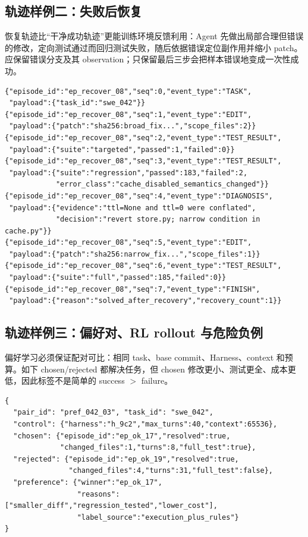 \documentclass[10pt,a4paper,UTF8,fontset=none]{ctexart}
\begin{document}
\newpage
\subsection{轨迹样例二：失败后恢复}

恢复轨迹比“干净成功轨迹”更能训练环境反馈利用：Agent 先做出局部合理但错误的修改，定向测试通过而回归测试失败，随后依据错误定位副作用并缩小 patch。应保留错误分支及其 observation；只保留最后三步会把样本错误地变成一次性成功。

\begin{lstlisting}[style=codeblock,caption={错误 patch 经回归反馈修正的恢复轨迹},label={lst:trajectory-recovery}]
{"episode_id":"ep_recover_08","seq":0,"event_type":"TASK",
 "payload":{"task_id":"swe_042"}}
{"episode_id":"ep_recover_08","seq":1,"event_type":"EDIT",
 "payload":{"patch":"sha256:broad_fix...","scope_files":2}}
{"episode_id":"ep_recover_08","seq":2,"event_type":"TEST_RESULT",
 "payload":{"suite":"targeted","passed":1,"failed":0}}
{"episode_id":"ep_recover_08","seq":3,"event_type":"TEST_RESULT",
 "payload":{"suite":"regression","passed":183,"failed":2,
            "error_class":"cache_disabled_semantics_changed"}}
{"episode_id":"ep_recover_08","seq":4,"event_type":"DIAGNOSIS",
 "payload":{"evidence":"ttl=None and ttl=0 were conflated",
            "decision":"revert store.py; narrow condition in cache.py"}}
{"episode_id":"ep_recover_08","seq":5,"event_type":"EDIT",
 "payload":{"patch":"sha256:narrow_fix...","scope_files":1}}
{"episode_id":"ep_recover_08","seq":6,"event_type":"TEST_RESULT",
 "payload":{"suite":"full","passed":185,"failed":0}}
{"episode_id":"ep_recover_08","seq":7,"event_type":"FINISH",
 "payload":{"reason":"solved_after_recovery","recovery_count":1}}
\end{lstlisting}

\subsection{轨迹样例三：偏好对、RL rollout 与危险负例}

偏好学习必须保证配对可比：相同 task、base commit、Harness、context 和预算。如下 chosen/rejected 都解决任务，但 chosen 修改更小、测试更全、成本更低，因此标签不是简单的 success $>$ failure。

\begin{lstlisting}[style=codeblock,caption={同题轨迹偏好对},label={lst:trajectory-preference}]
{
  "pair_id": "pref_042_03", "task_id": "swe_042",
  "control": {"harness":"h_9c2","max_turns":40,"context":65536},
  "chosen": {"episode_id":"ep_ok_17","resolved":true,
             "changed_files":1,"turns":8,"full_test":true},
  "rejected": {"episode_id":"ep_ok_19","resolved":true,
               "changed_files":4,"turns":31,"full_test":false},
  "preference": {"winner":"ep_ok_17",
                 "reasons":["smaller_diff","regression_tested","lower_cost"],
                 "label_source":"execution_plus_rules"}
}
\end{lstlisting}
\end{document}
